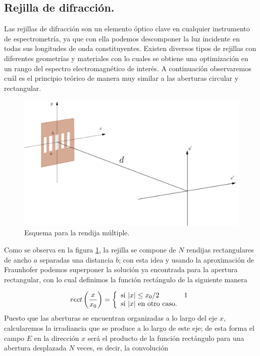 \subsection{Rejilla de difracción.}
Las rejillas de difracción son un elemento óptico clave en cualquier instrumento de espectrometría, ya que con ella podemos descomponer la luz incidente en todas sus longitudes de onda constituyentes. Existen diversos tipos de rejillas con diferentes geometrías y materiales con lo cuales se obtiene una optimización en un rango del espectro electromagnético de interés. A continuación observaremos cuál es el principio teórico de manera muy similar a las aberturas circular y rectangular.\\

\begin{figure}[H]
    \centering
    \includegraphics[width=0.8\linewidth]{Kap1/apertura_rejilla.png}
    \caption{Esquema para la rendija múltiple.} 
    \label{esq_rejilla}
\end{figure}
Como se observa en la figura \ref{esq_rejilla}, la rejilla se compone de $N$ rendijas rectangulares de ancho $a$ separadas una distancia $b$; con esta idea y usando la aproximación de Fraunhofer podemos superponer la solución ya encontrada para la apertura rectangular, con lo cual definimos la función rectángulo de la siguiente manera

\begin{equation}
    rect\left(\frac{x}{x_0}\right)=\left\lbrace
    \begin{array}{ll}
        \textup{si } |x|\leq {x_0}/2 & 1\\
        \textup{si } |x| \textup{ en otro caso.}
    \end{array}
    \right.
\end{equation}
Puesto que las aberturas se encuentran organizadas a lo largo del eje $x$, calcularemos la irradiancia que se produce a lo largo de este eje; de esta forma el campo $E$ en la dirección $x$ será el producto de la función rectángulo para una abertura desplazada $N$ veces, es decir, la convolución 

